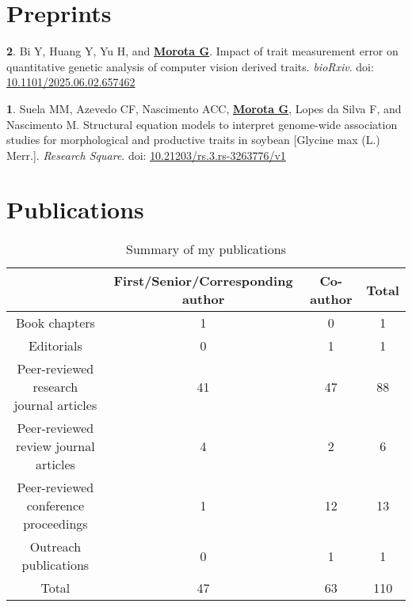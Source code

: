 \documentclass[margin,line,10pt]{res}
\newenvironment{list1}{
  \begin{list}{\ding{113}}{%
      \setlength{\itemsep}{0in}
      \setlength{\parsep}{0in} \setlength{\parskip}{0in}
      \setlength{\topsep}{0in} \setlength{\partopsep}{0in} 
      \setlength{\leftmargin}{0.17in}}}{\end{list}}
\begin{document}
\begin{resume}
\begin{comment}
    \end{list1}
\end{comment}


\vspace{0.5cm}
\section{\sc Preprints}
\begin{list1}




\item  [{\bf 2}.] Bi Y, Huang Y, Yu H, and \textbf{\underline{Morota G}}. Impact of trait measurement error on quantitative genetic analysis of computer vision derived traits. \emph{bioRxiv}. doi: \textcolor{blue}{\href{https://doi.org/10.1101/2025.06.02.657462}{10.1101/2025.06.02.657462}}

\vspace{0.5cm}

  \item  [{\bf 1}.] Suela MM, Azevedo CF, Nascimento ACC, \textbf{\underline{Morota G}}, Lopes da Silva F, and Nascimento M. Structural equation models to interpret genome-wide association
  studies for morphological and productive traits in soybean [Glycine max (L.) Merr.].  \emph{Research Square}. doi: \textcolor{blue}{\href{https://doi.org/10.21203/rs.3.rs-3263776/v1}{10.21203/rs.3.rs-3263776/v1}}


\end{list1}

  
\vspace{0.5cm}


\section{\sc Publications}
\vspace{1cm}

\begin{table}[h!]
\centering
  \begin{tabular}{ |c|c|c|c| }
 \hline
 & First/Senior/Corresponding author & Co-author & Total \\  \hline
 Book chapters & 1 & 0 & 1 \\ \hline
 Editorials & 0 & 1 & 1 \\ \hline
 Peer-reviewed research journal articles  & 41 & 47 & 88 \\  \hline
 Peer-reviewed review journal articles  & 4 & 2 & 6 \\  \hline
 Peer-reviewed conference proceedings & 1 & 12 & 13 \\ \hline
 Outreach publications & 0 & 1 & 1 \\ \hline
 Total & 47 &  63 & 110 \\ \hline
  \end{tabular}
    \caption{Summary of my publications}
\end{table}



\end{resume}
\end{document}
